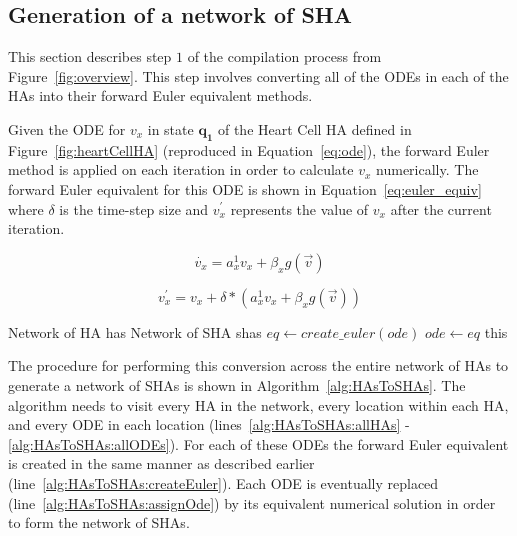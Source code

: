 \subsection{Generation of a network of \ac{SHA}}
\label{sec:shaGeneration}

This section describes step $1$ of the compilation process from Figure~\ref{fig:overview}.
This step involves converting all of the \acp{ODE} in each of the \acp{HA} into their forward Euler equivalent methods.

Given the \ac{ODE} for $v_x$ in state $\mathbf{q_1}$ of the Heart Cell \ac{HA} defined in Figure~\ref{fig:heartCellHA} (reproduced in Equation~\ref{eq:ode}), the forward Euler method is applied on each iteration in order to calculate $v_x$ numerically.
The forward Euler equivalent for this ODE is shown in Equation~\ref{eq:euler_equiv} where $\delta$ is the time-step size and $v^\prime_x$ represents the value of $v_x$ after the current iteration.

\begin{equation}
\dot{v_x} = a^1_x v_x + \beta_x g(\vec{v})
\label{eq:ode}
\end{equation}

\begin{equation}
v^\prime_x = v_x + \delta * (a^1_x v_x + \beta_x g(\vec{v}))
\label{eq:euler_equiv}
\end{equation}

\renewcommand{\algorithmiccomment}[1]{// #1}
\renewcommand{\algorithmicrequire}{\textbf{Input:}}
\renewcommand{\algorithmicensure}{\textbf{Output:}}
\begin{algorithm}[t!]
	\begin{algorithmic}[1]
		\REQUIRE Network of HA has 
		\ENSURE Network of SHA shas
		 \label{alg:HAsToSHAs:allHAs}
		  \label{alg:HAsToSHAs:allLocs}
		 \label{alg:HAsToSHAs:allODEs}
		\STATE $eq \leftarrow create\_euler(ode)$ \label{alg:HAsToSHAs:createEuler}
		\STATE $ode \leftarrow eq$ \label{alg:HAsToSHAs:assignOde}
		\ENDFOR
		\ENDFOR
		\ENDFOR
		\RETURN this
	\end{algorithmic}
	\caption{The algorithm to generate a Network of \acp{SHA} from a Network of \acp{HA}}
	\label{alg:HAsToSHAs}
\end{algorithm}

The procedure for performing this conversion across the entire network of \acp{HA} to generate a network of \acp{SHA} is shown in Algorithm~\ref{alg:HAsToSHAs}.
The algorithm needs to visit every \ac{HA} in the network, every location within each \ac{HA}, and every \ac{ODE} in each location (lines~\ref{alg:HAsToSHAs:allHAs} - \ref{alg:HAsToSHAs:allODEs}).
For each of these \acp{ODE} the forward Euler equivalent is created in the same manner as described earlier (line~\ref{alg:HAsToSHAs:createEuler}).
Each \ac{ODE} is eventually replaced (line~\ref{alg:HAsToSHAs:assignOde}) by its equivalent numerical solution in order to form the network of \acp{SHA}.
